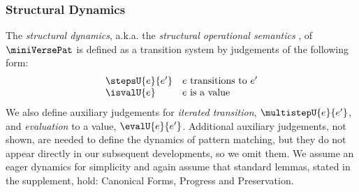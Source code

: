 \documentclass[acmlarge,review,anonymous]{acmart}\settopmatter{printfolios=true}
\begin{document}



\subsubsection{Structural Dynamics}\label{sec:dynamics-U}
The \emph{structural dynamics}, a.k.a. the \emph{structural operational semantics} \cite{DBLP:journals/jlp/Plotkin04a}, of $\miniVersePat$ is defined as a transition system by judgements of the following form:
\[\begin{array}{ll}
\stepsU{e}{e'} & \text{$e$ transitions to $e'$}\\
\isvalU{e} & \text{$e$ is a value}
\end{array}\]
We also define auxiliary judgements for \emph{iterated transition}, $\multistepU{e}{e'}$, and \emph{evaluation} to a value, $\evalU{e}{e'}$. Additional auxiliary judgements, not shown, are needed to define the dynamics of pattern matching, but they do not appear directly in our subsequent developments, so we omit them. We assume an eager dynamics for simplicity and again assume that standard lemmas, stated in the supplement, hold: Canonical Forms, Progress and Preservation. 
\end{document}
